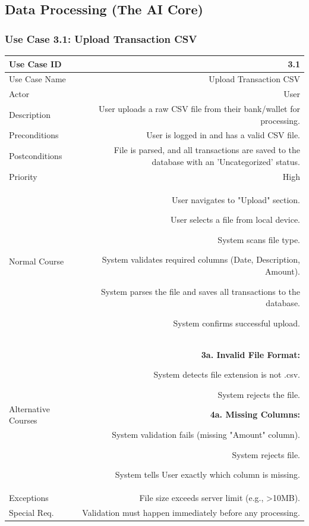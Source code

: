 \documentclass[11pt,a4paper]{report}
\begin{document}
\newpage

\subsection{Data Processing (The AI Core)}

\subsubsection{Use Case 3.1: Upload Transaction CSV}
\begin{tabularx}{\textwidth}{|L|R|}
	\hline
	Use Case ID & 3.1 \\ \hline
	Use Case Name & Upload Transaction CSV \\ \hline
	Actor & User \\ \hline
	Description & User uploads a raw CSV file from their bank/wallet for processing. \\ \hline
	Preconditions & User is logged in and has a valid CSV file. \\ \hline
	Postconditions & File is parsed, and all transactions are saved to the database with an 'Uncategorized' status. \\ \hline
	Priority & High \\ \hline
	Normal Course & 
	\begin{normalsteps}
		\item User navigates to "Upload" section.
		\item User selects a file from local device.
		\item System scans file type.
		\item System validates required columns (Date, Description, Amount).
		\item System parses the file and saves all transactions to the database.
		\item System confirms successful upload.
	\end{normalsteps} \\ \hline
	Alternative Courses & 
	\textbf{3a. Invalid File Format:} 
	\begin{altsteps}
		\item System detects file extension is not .csv.
		\item System rejects the file.
	\end{altsteps}
	\textbf{4a. Missing Columns:} 
	\begin{altsteps}
		\item System validation fails (missing "Amount" column).
		\item System rejects file.
		\item System tells User exactly which column is missing.
	\end{altsteps} \\ \hline
	Exceptions & File size exceeds server limit (e.g., >10MB). \\ \hline
	Special Req. & Validation must happen immediately before any processing. \\ \hline
\end{tabularx}
\end{document}
